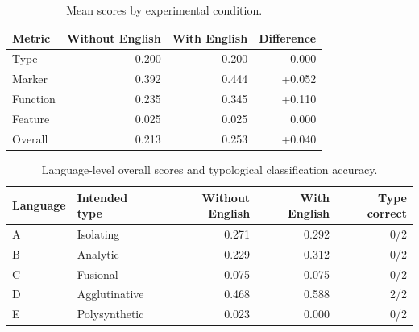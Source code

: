 \documentclass[11pt]{article}
\begin{document}
\begin{table}[t]
    \centering
    \small
    \caption{Mean scores by experimental condition.}
    \label{tab:condition-means}
    \begin{tabular}{lrrr}
        \toprule
        Metric & Without English & With English & Difference \\
        \midrule
        Type & 0.200 & 0.200 & 0.000 \\
        Marker & 0.392 & 0.444 & +0.052 \\
        Function & 0.235 & 0.345 & +0.110 \\
        Feature & 0.025 & 0.025 & 0.000 \\
        Overall & 0.213 & 0.253 & +0.040 \\
        \bottomrule
    \end{tabular}
\end{table}

\begin{table}[t]
    \centering
    \small
    \caption{Language-level overall scores and typological classification accuracy.}
    \label{tab:language-results}
    \begin{tabular}{llrrr}
        \toprule
        Language & Intended type & Without English & With English & Type correct \\
        \midrule
        A & Isolating & 0.271 & 0.292 & 0/2 \\
        B & Analytic & 0.229 & 0.312 & 0/2 \\
        C & Fusional & 0.075 & 0.075 & 0/2 \\
        D & Agglutinative & 0.468 & 0.588 & 2/2 \\
        E & Polysynthetic & 0.023 & 0.000 & 0/2 \\
        \bottomrule
    \end{tabular}
\end{table}

\noindent
\end{document}

